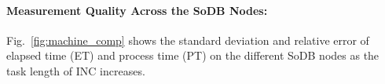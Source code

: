 \documentclass[10pt]{article}
\begin{document}
\clearpage
\newpage
\paragraph{Measurement Quality Across the SoDB Nodes:} 
Fig.~\ref{fig:machine_comp} shows 
the standard deviation and relative error of 
elapsed time (ET) and process time (PT) on the different SoDB nodes 
as the task length of INC increases. 

\begin{figure}[h]
	\centering
\end{figure}
\end{document}
